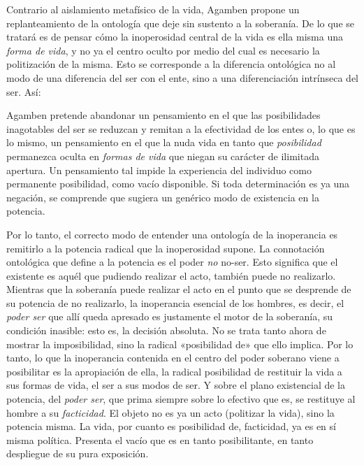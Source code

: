 Contrario al aislamiento metafísico de la vida, Agamben propone un replanteamiento de la ontología que deje sin sustento a la soberanía. De lo que se tratará es de pensar cómo la inoperosidad central de la vida es ella misma una \emph{forma de vida}, y no ya el centro oculto por medio del cual es necesario la politización de la misma. Esto se corresponde a la diferencia ontológica no al modo de una diferencia del ser con el ente, sino a una diferenciación intrínseca del ser. Así:

Agamben pretende abandonar un pensamiento en el que las posibilidades inagotables del ser se reduzcan y remitan a la efectividad de los entes o, lo que es lo mismo, un pensamiento en el que la nuda vida en tanto que \emph{posibilidad }permanezca oculta en \emph{formas de vida} que niegan su carácter de ilimitada apertura. Un pensamiento tal impide la experiencia del individuo como permanente posibilidad, como vacío disponible. Si toda determinación es ya una negación, se comprende que sugiera un genérico modo de existencia en la potencia.

Por lo tanto, el correcto modo de entender una ontología de la inoperancia es remitirlo a la potencia radical que la inoperosidad supone. La connotación ontológica que define a la potencia es el poder \emph{no} no-ser. Esto significa que el existente es aquél que pudiendo realizar el acto, también puede no realizarlo. Mientras que la soberanía puede realizar el acto en el punto que se desprende de su potencia de no realizarlo, la inoperancia esencial de los hombres, es decir, el \emph{poder ser} que allí queda apresado es justamente el motor de la soberanía, su condición inasible: esto es, la decisión absoluta. No se trata tanto ahora de mostrar la imposibilidad, sino la radical «posibilidad de» que ello implica. Por lo tanto, lo que la inoperancia contenida en el centro del poder soberano viene a posibilitar es la apropiación de ella, la radical posibilidad de restituir la vida a sus formas de vida, el ser a sus modos de ser. Y sobre el plano existencial de la potencia, del \emph{poder ser}, que prima siempre sobre lo efectivo que es, se restituye al hombre a su \emph{facticidad}. El objeto no es ya un acto (politizar la vida), sino la potencia misma. La vida, por cuanto es posibilidad de, facticidad, ya es en sí misma política. Presenta el vacío que es en tanto posibilitante, en tanto despliegue de su pura exposición.

